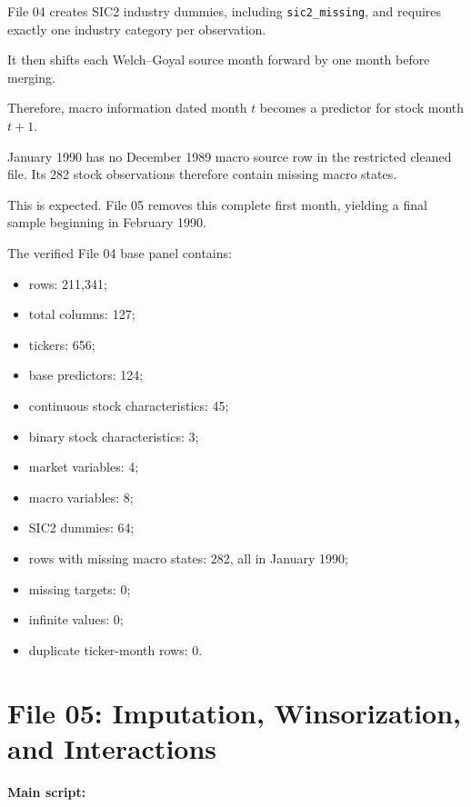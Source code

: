 \documentclass[11pt,a4paper]{article}
\newcommand{\code}[1]{\texttt{#1}}
\begin{document}
File 04 creates SIC2 industry dummies, including
\code{sic2\_missing}, and requires exactly one industry category per
observation.

It then shifts each Welch--Goyal source month forward by one month before
merging.

Therefore, macro information dated month \(t\) becomes a predictor for stock
month \(t+1\).

January 1990 has no December 1989 macro source row in the restricted cleaned
file. Its 282 stock observations therefore contain missing macro states.

This is expected. File 05 removes this complete first month, yielding a final
sample beginning in February 1990.

The verified File 04 base panel contains:

\begin{itemize}
  \item rows: 211,341;
  \item total columns: 127;
  \item tickers: 656;
  \item base predictors: 124;
  \item continuous stock characteristics: 45;
  \item binary stock characteristics: 3;
  \item market variables: 4;
  \item macro variables: 8;
  \item SIC2 dummies: 64;
  \item rows with missing macro states: 282, all in January 1990;
  \item missing targets: 0;
  \item infinite values: 0;
  \item duplicate ticker-month rows: 0.
\end{itemize}


\section{File 05: Imputation, Winsorization, and Interactions}

\textbf{Main script:}

\begin{center}
\end{center}
\end{document}
